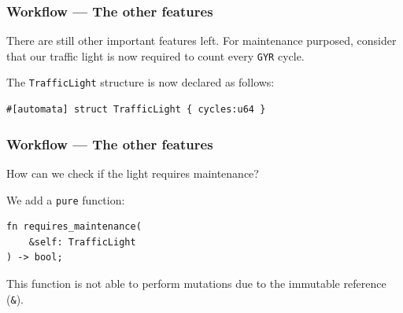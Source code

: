 \documentclass[bigger,notes]{beamer}
\begin{document}
\begin{frame}[fragile]
    \frametitle{Workflow --- The other features}
    There are still other important features left.
    For maintenance purposed, consider that our traffic light is now required to count every \texttt{GYR} cycle. %

    The \texttt{TrafficLight} structure is now declared as follows:
    \begin{listing}
        \centering
        \begin{verbatim}
#[automata] struct TrafficLight { cycles:u64 }
        \end{verbatim}
    \end{listing}

\end{frame}

\begin{frame}[fragile]
    \frametitle{Workflow --- The other features}
    How can we check if the light requires maintenance?

    We add a \texttt{pure} function:
    \begin{listing}
        \centering
        \begin{verbatim}
fn requires_maintenance(
    &self: TrafficLight
) -> bool;
        \end{verbatim}
    \end{listing}
    This function is not able to perform mutations due to the immutable reference (\texttt{\&}).

\end{frame}
\end{document}
